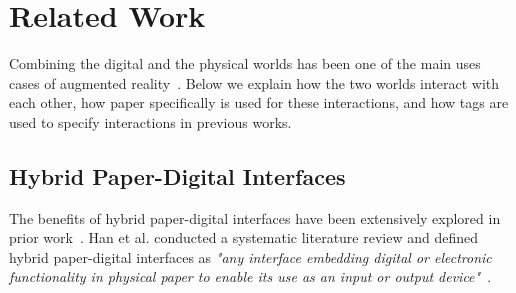 \section{Related Work}

Combining the digital and the physical worlds has been one of the main uses cases of augmented reality~\cite{dogan_fabricate_2022, dogan_augmented_2024}. %
Below we explain how the two worlds interact with each other, how paper specifically is used for these interactions, %
and how tags are used to specify interactions in previous works.





\subsection{Hybrid Paper-Digital Interfaces}
The benefits of hybrid paper-digital interfaces have been extensively explored in prior work~\cite{rajaram_paper_2022, li_holodoc_2019, alessandrini_audio-augmented_2014, song_penlight_2009}. Han et al. conducted a systematic literature review and defined hybrid paper-digital interfaces as \textit{"any interface embedding digital or electronic functionality in physical paper to enable its use as an input or output device"}~\cite{han_hybrid_2021}.

